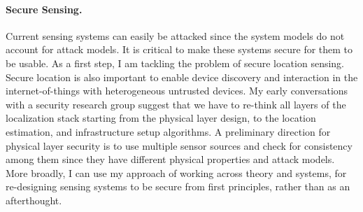 \documentclass[10pt]{article}
\begin{document}
\paragraph{Secure Sensing. }
Current sensing systems can easily be attacked since the system models do not account for attack models. It is critical to make these systems secure for them to be usable. As a first step, I am tackling the problem of secure location sensing. Secure location is also important to enable device discovery and interaction in the internet-of-things with heterogeneous untrusted devices. My early conversations with a security research group suggest that we have to re-think all layers of the localization stack starting from the physical layer design, to the location estimation, and infrastructure setup algorithms. A preliminary direction for physical layer security is to use multiple sensor sources and check for consistency among them since they have different physical properties and attack models. More broadly, I can use my approach of working across theory and systems, for re-designing sensing systems to be secure from first principles, rather than as an afterthought. 

\end{document}

